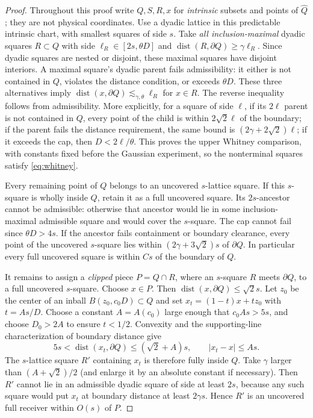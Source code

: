 \documentclass[11pt]{article}
\theoremstyle{definition}
\theoremstyle{remark}
\numberwithin{equation}{section}
\newcommand{\dist}{\operatorname{dist}}
\begin{document}
\begin{proof}
Throughout this proof write $Q,S,R,x$ for \emph{intrinsic} subsets and
points of $\widehat Q$; they are not physical coordinates.
Use a dyadic lattice in this predictable intrinsic chart, with smallest
squares of side $s$.
Take \emph{all inclusion-maximal} dyadic squares $R\subset Q$ with side
$\ell_R\in[2s,\theta D]$ and
$\dist(R,\partial Q)\ge\gamma\ell_R$.
Since dyadic squares are nested or disjoint, these maximal squares have
disjoint interiors. A maximal square's dyadic parent fails admissibility:
it either is not contained in $Q$, violates the distance condition, or
exceeds $\theta D$. These three alternatives imply
$\dist(x,\partial Q)\lesssim_{\gamma,\theta}\ell_R$ for
$x\in R$. The reverse inequality follows from admissibility. More explicitly,
for a square of side $\ell$, if its $2\ell$ parent is not contained
in $Q$, every point of the child is within $2\sqrt2\ell$ of the
boundary; if the parent fails the distance requirement, the same
bound is $(2\gamma+2\sqrt2)\ell$; if it exceeds the cap, then
$D<2\ell/\theta$. This proves the upper Whitney comparison, with
constants fixed before the Gaussian experiment, so the
nonterminal squares satisfy \eqref{eq:whitney}.

Every remaining point of $Q$ belongs to an uncovered $s$-lattice square.
If this $s$-square is wholly inside $Q$, retain it as a full uncovered
square. Its $2s$-ancestor cannot be admissible: otherwise that ancestor would
lie in some inclusion-maximal admissible square and would cover the
$s$-square. The cap cannot fail since $\theta D>4s$.
If the ancestor fails containment or boundary clearance, every point of
the uncovered $s$-square lies within $(2\gamma+3\sqrt2)s$ of
$\partial Q$. In particular every full uncovered square is
within $Cs$ of the boundary of $Q$.

It remains to assign a \emph{clipped} piece $P=Q\cap R$, where an
$s$-square $R$ meets $\partial Q$, to a full uncovered $s$-square.
Choose $x\in P$. Then $\dist(x,\partial Q)\le\sqrt2s$.
\label{not:receiverconstants}
Let $z_0$ be the center of an inball $B(z_0,c_0D)\subset Q$ and set
$x_t=(1-t)x+tz_0$ with $t=A s/D$. Choose a constant $A=A(c_0)$ large
enough that $c_0As>5s$, and choose $D_0>2A$ to ensure $t<1/2$.
Convexity and the supporting-line characterization of boundary distance give
\[
 5s<\dist(x_t,\partial Q)\le(\sqrt2+A)s,
 \qquad |x_t-x|\le As.
\]
The $s$-lattice square $R'$ containing $x_t$ is therefore fully inside $Q$.
Take $\gamma$ larger than $(A+\sqrt2)/2$ (and enlarge it by an absolute
constant if necessary). Then $R'$ cannot lie in an admissible
dyadic square of side at least $2s$, because any such square would put
$x_t$ at boundary distance at least $2\gamma s$. Hence $R'$ is an
uncovered full receiver within $O(s)$ of $P$.


\end{proof}
\end{document}

